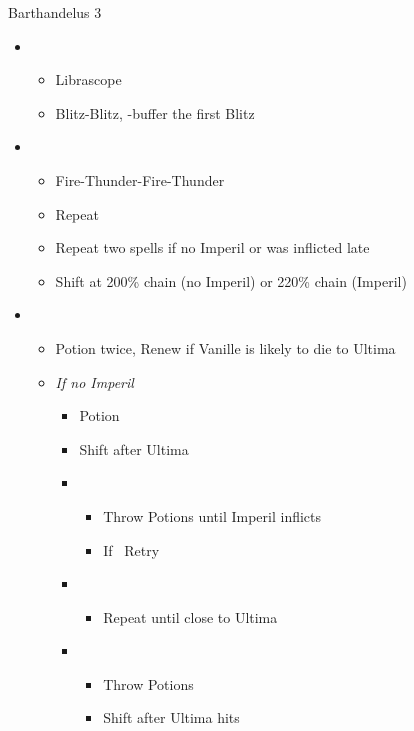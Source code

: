 \begin{battle}[1:26]{Barthandelus 3}
		\begin{itemize}
			\item \second
			      \begin{itemize}
				      \item Librascope
				      \item Blitz-Blitz, \rav-buffer the first Blitz
			      \end{itemize}
			\item \fifth
			      \begin{itemize}
				      \item Fire-Thunder-Fire-Thunder
				      \item Repeat
				      \item Repeat two spells if no Imperil or was inflicted late
				      \item Shift at 200\% chain (no Imperil) or 220\% chain (Imperil)
			      \end{itemize}
			\item \third
			      \begin{itemize}
				      \item Potion twice, Renew if Vanille is likely to die to Ultima
				      \item \textit{If no Imperil}
				            \begin{itemize}
					            \item Potion
					            \item Shift after Ultima
					            \item \fifth
					                  \begin{itemize}
						                  \item Throw Potions until Imperil inflicts
						                  \item If \stagger\ Retry
					                  \end{itemize}
					            \item \first
					                  \begin{itemize}
						                  \item Repeat until close to Ultima
					                  \end{itemize}
					            \item \third
					                  \begin{itemize}
						                  \item Throw Potions
						                  \item Shift after Ultima hits

\end{itemize}
\end{itemize}
\end{itemize}
\end{itemize}
\end{battle}
